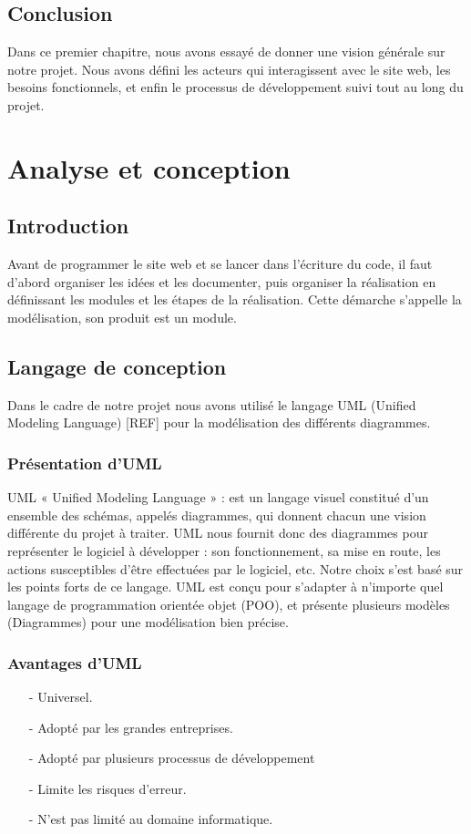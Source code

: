 \documentclass[11.5pt]{report}
\begin{document}
\section{Conclusion}
Dans ce premier chapitre, nous avons essayé de donner une vision générale sur notre projet. Nous avons défini les acteurs qui interagissent avec le site web, les besoins fonctionnels, et enfin le processus de développement suivi tout au long du projet. 

\chapter{Analyse et conception}
\newpage
\section{Introduction}

Avant de programmer le site web et se lancer dans l’écriture du code, il faut d’abord organiser les idées et les documenter, puis organiser la réalisation en définissant les modules et les étapes de la réalisation. Cette démarche s’appelle la modélisation, son produit est un module.

\section{Langage de conception }
Dans le cadre de notre projet nous avons utilisé le langage UML (Unified Modeling Language) [REF] pour la modélisation des différents diagrammes.
\subsection{Présentation d’UML }
UML « Unified Modeling Language » : est un langage visuel constitué d’un ensemble des schémas, appelés diagrammes, qui donnent chacun une vision différente du projet à traiter.
UML nous fournit donc des diagrammes pour représenter le logiciel à développer : son fonctionnement, sa mise en route, les actions susceptibles d’être effectuées par le logiciel, etc.
Notre choix s'est basé sur les points forts de ce langage. UML est conçu pour s'adapter à n'importe quel langage de programmation orientée objet (POO), et présente plusieurs modèles (Diagrammes) pour une modélisation bien précise.\\

\subsection{Avantages d’UML }
\begin{itemize}
	\item [-] Universel.
	\item [-] Adopté par les grandes entreprises. 
	\item [-] Adopté par plusieurs processus de développement 
	\item [-] Limite les risques d’erreur. 
	\item [-] N’est pas limité au domaine informatique.
	
\end{itemize}
\end{document}
